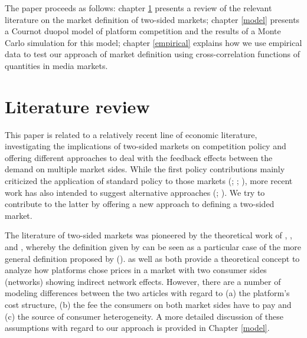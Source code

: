 \documentclass[12pt,a4paper,notitlepage]{article}
\begin{document}
The paper proceeds as follows: chapter \ref{litrev} presents a review of the relevant literature on the market definition of two-sided markets; chapter \ref{model} presents a Cournot duopol model of platform competition and the results of a Monte Carlo simulation for this model; chapter \ref{empirical}  explains how we use empirical data to test our approach of market definition using cross-correlation functions of quantities in media markets.



\section{Literature review}\label{litrev}
This paper is related to a relatively recent line of economic literature, investigating the implications of two-sided markets on competition policy and offering different approaches to deal with the feedback effects between the demand on multiple market sides. While the first policy contributions mainly criticized the application of standard policy to those markets (\citet{wright_onesided_2004}; \citet{leonello_horizontal_2010}; \cite{chandra_mergers_2009}), more recent work has also intended to suggest alternative approaches (\citet{argentesi_estimating_2007}; \citet{song_estimating_2015}). We try to contribute to the latter by offering a new approach to defining a two-sided market. 

The literature of two-sided markets was pioneered by the theoretical work of \citet{caillaud_chicken_2003}, \citet{rochet_platform_2003}, \citet{evans_antitrust_2003} and \citet{armstrong_competition_2006}, whereby the definition given by \citet{evans_antitrust_2003} can be seen as a particular case of the more general definition proposed by \cite{rochet_platform_2003} (\citet{filistrucchi_identifying_2012}). \citet{rochet_platform_2003} as well as \citet{armstrong_competition_2006} both provide a theoretical concept to analyze how platforms chose prices in a market with two consumer sides (networks) showing indirect network effects. However, there are a number of modeling differences between the two articles with regard to (a) the platform's cost structure, (b) the fee the consumers on both market sides have to pay and (c) the source of consumer heterogeneity. A more detailed discussion of these assumptions with regard to our approach is provided in Chapter \ref{model}.  
\end{document}

